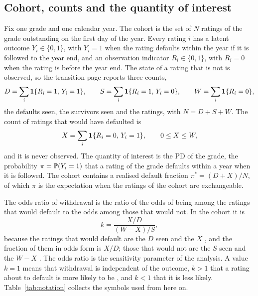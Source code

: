 \subsection{Cohort, counts and the quantity of interest}

Fix one grade and one calendar year. The cohort is the set of $N$ ratings of the grade outstanding on the first day of the year. Every rating $i$ has a latent outcome $Y_i\in\{0,1\}$, with $Y_i=1$ when the rating defaults within the year if it is followed to the year end, and an observation indicator $R_i\in\{0,1\}$, with $R_i=0$ when the rating is \wdn{} before the year end. The state of a rating that is not \wdn{} is observed, so the transition page reports three counts,
\begin{equation}
D=\sum_{i}\mathbf{1}\{R_i=1,\,Y_i=1\},\qquad S=\sum_{i}\mathbf{1}\{R_i=1,\,Y_i=0\},\qquad W=\sum_{i}\mathbf{1}\{R_i=0\},
\label{eq:counts}
\end{equation}
the defaults seen, the survivors seen and the \wdn{} ratings, with $N=D+S+W$. The count of \wdn{} ratings that would have defaulted is
\begin{equation}
X=\sum_{i}\mathbf{1}\{R_i=0,\,Y_i=1\},\qquad 0\le X\le W,
\label{eq:x}
\end{equation}
and it is never observed. The quantity of interest is the PD of the grade, the probability $\pi=\mathbb{P}(Y_i=1)$ that a rating of the grade defaults within a year when it is followed. The cohort contains a realised default fraction $\pi^{\ast}=(D+X)/N$, of which $\pi$ is the expectation when the ratings of the cohort are exchangeable.

The odds ratio of withdrawal is the ratio of the odds of being \wdn{} among the ratings that would default to the odds among those that would not. In the cohort it is
\begin{equation}
k=\frac{X/D}{(W-X)/S},
\label{eq:k}
\end{equation}
because the ratings that would default are the $D$ seen and the $X$ \wdn{}, and the \wdn{} fraction of them in odds form is $X/D$; those that would not are the $S$ seen and the $W-X$ \wdn{}. The odds ratio is the sensitivity parameter of the analysis. A value $k=1$ means that withdrawal is independent of the outcome, $k>1$ that a rating about to default is more likely to be \wdn{}, and $k<1$ that it is less likely. Table~\ref{tab:notation} collects the symbols used from here on.

